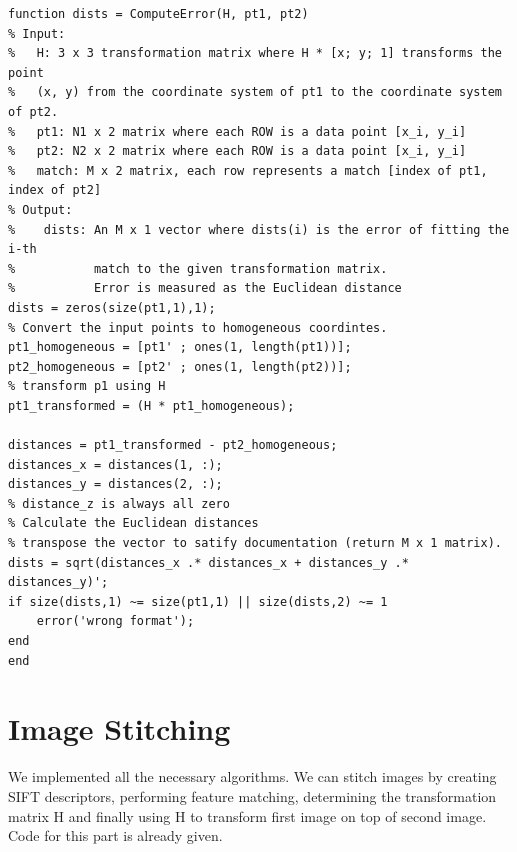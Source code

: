 \documentclass{article}
\begin{document}
\begin{lstlisting}[caption={My implementation of ComputeError function.},captionpos=b]
function dists = ComputeError(H, pt1, pt2)
% Input:
%   H: 3 x 3 transformation matrix where H * [x; y; 1] transforms the point
%   (x, y) from the coordinate system of pt1 to the coordinate system of pt2.
%   pt1: N1 x 2 matrix where each ROW is a data point [x_i, y_i]
%   pt2: N2 x 2 matrix where each ROW is a data point [x_i, y_i]
%   match: M x 2 matrix, each row represents a match [index of pt1, index of pt2]
% Output:
%    dists: An M x 1 vector where dists(i) is the error of fitting the i-th
%           match to the given transformation matrix.
%           Error is measured as the Euclidean distance
dists = zeros(size(pt1,1),1);
% Convert the input points to homogeneous coordintes.
pt1_homogeneous = [pt1' ; ones(1, length(pt1))];
pt2_homogeneous = [pt2' ; ones(1, length(pt2))];
% transform p1 using H
pt1_transformed = (H * pt1_homogeneous);

distances = pt1_transformed - pt2_homogeneous;
distances_x = distances(1, :);
distances_y = distances(2, :);
% distance_z is always all zero
% Calculate the Euclidean distances
% transpose the vector to satify documentation (return M x 1 matrix). 
dists = sqrt(distances_x .* distances_x + distances_y .* distances_y)';
if size(dists,1) ~= size(pt1,1) || size(dists,2) ~= 1
    error('wrong format');
end
end
\end{lstlisting}
\newpage

\section{Image Stitching}
We implemented all the necessary algorithms. We can stitch images by creating SIFT descriptors, performing feature matching, determining the transformation matrix H and finally using H to transform first image on top of second image. Code for this part is already given.
\end{document}

